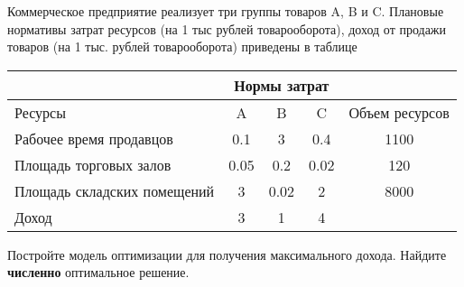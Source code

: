 \begin{exercise}
Коммерческое предприятие реализует три группы товаров A, B и C.
Плановые нормативы затрат ресурсов (на 1 тыс рублей товарооборота),
доход от продажи товаров (на 1 тыс. рублей товарооборота)
приведены в таблице
\begin{center}\small
	\begin{tabular}{|l|c|c|c|c|}
	\hline
	& \multicolumn{3}{|c|}{Нормы затрат} & \\ \hline
	Ресурсы & A & B & C & Объем ресурсов \\ \hline
	Рабочее время продавцов & 0.1 & 3 & 0.4 & 1100 \\
	Площадь торговых залов & 0.05 & 0.2 & 0.02 & 120 \\
	Площадь складских помещений & 3 & 0.02 & 2 & 8000 \\ \hline
	Доход & 3 & 1 & 4 &  \\
	\hline
	\end{tabular}
\end{center}
Постройте модель оптимизации для получения максимального дохода.
Найдите \textbf{численно} оптимальное решение.
\end{exercise}



